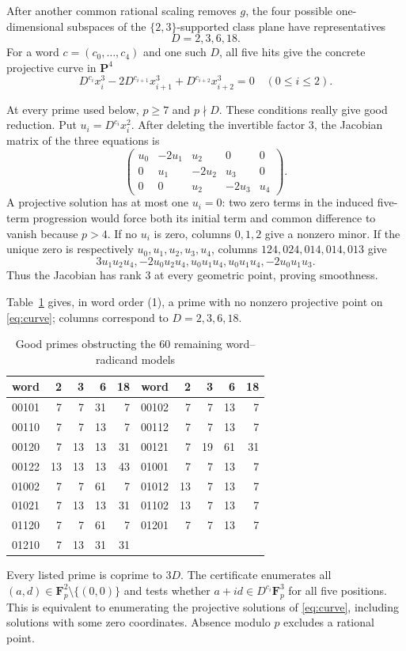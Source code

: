 \documentclass[10pt]{article}
\newcommand{\F}{\mathbf F}
\begin{document}
After another common rational scaling removes $g$, the four possible
one-dimensional subspaces of the $\{2,3\}$-supported class plane have
representatives
\[
D=2,3,6,18.
\]
For a word $c=(c_0,\ldots,c_4)$ and one such $D$, all five hits give the
concrete projective curve in $\mathbf P^4$
\begin{equation}\label{eq:curve}
D^{c_i}x_i^3-2D^{c_{i+1}}x_{i+1}^3
 +D^{c_{i+2}}x_{i+2}^3=0\quad(0\leq i\leq2).
\end{equation}

At every prime used below, $p\geq7$ and $p\nmid D$.  These conditions really
give good reduction.  Put $u_i=D^{c_i}x_i^2$.  After deleting the invertible
factor 3, the Jacobian matrix of the three equations is
\[
\begin{pmatrix}
u_0&-2u_1&u_2&0&0\\
0&u_1&-2u_2&u_3&0\\
0&0&u_2&-2u_3&u_4
\end{pmatrix}.
\]
A projective solution has at most one $u_i=0$: two zero terms in the induced
five-term progression would force both its initial term and common difference
to vanish because $p>4$.  If no $u_i$ is zero, columns $0,1,2$ give a nonzero
minor.  If the unique zero is respectively $u_0,u_1,u_2,u_3,u_4$, columns
$124,024,014,014,013$ give
\[
3u_1u_2u_4,-2u_0u_2u_4,u_0u_1u_4,u_0u_1u_4,-2u_0u_1u_3.
\]
Thus the Jacobian has rank 3 at every geometric point, proving smoothness.

Table~\ref{tab:local-obstructions} gives, in word order (1), a prime with no
nonzero projective point on \eqref{eq:curve}; columns correspond to
$D=2,3,6,18$.
\begin{table}[ht]
\centering\small
\begin{tabular}{c|rrrr@{\qquad}c|rrrr}
\toprule
word&2&3&6&18&word&2&3&6&18\\\midrule
00101&7&7&31&7&00102&7&7&13&7\\
00110&7&7&13&7&00112&7&7&13&7\\
00120&7&13&13&31&00121&7&19&61&31\\
00122&13&13&13&43&01001&7&7&13&7\\
01002&7&7&61&7&01012&13&7&13&7\\
01021&7&13&13&31&01102&13&7&13&7\\
01120&7&7&61&7&01201&7&7&13&7\\
01210&7&13&31&31&&&&&\\
\bottomrule
\end{tabular}
\caption{Good primes obstructing the 60 remaining word--radicand models}
\label{tab:local-obstructions}
\end{table}
Every listed prime is coprime to $3D$.  The certificate enumerates all
$(a,d)\in\F_p^2\setminus\{(0,0)\}$ and tests whether
$a+id\in D^{c_i}\F_p^3$ for all five positions.  This is equivalent to
enumerating the projective solutions of \eqref{eq:curve}, including solutions
with some zero coordinates.  Absence modulo $p$ excludes a rational point.
\end{document}
